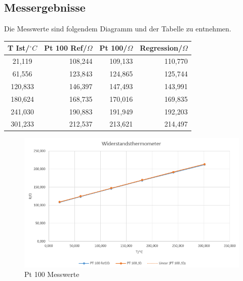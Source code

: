 \documentclass[a4paper,11pt,oneside]{article}
\begin{document}
\subsection{Messergebnisse}
Die Messwerte sind folgendem Diagramm und der Tabelle zu entnehmen. \\
\begin{center}
\begin{tabular}{|c|r|r|r|}
\hline 
T Ist/$^\circ C$ & Pt 100 Ref/$\Omega$ & Pt 100/$\Omega$ & Regression/$\Omega$ \\ 
\hline 
21,119 & 108,244 & 109,133 & 110,770 \\ 
\hline 
61,556 & 123,843 & 124,865 & 125,744 \\ 
\hline 
120,833 & 146,397 & 147,493 & 143,991 \\ 
\hline 
180,624 & 168,735 & 170,016 & 169,835 \\ 
\hline 
241,030 & 190,883 & 191,949 & 192,203 \\ 
\hline 
301,233 & 212,537 & 213,621 & 214,497 \\ 
\hline 
\end{tabular} 
\end{center}
\begin{figure}[h]
\centering
\includegraphics[scale=0.8]{Bilder/Aufg1Diagramm.png}
\caption{Pt 100 Messwerte}
\end{figure}
\newpage
\end{document}
